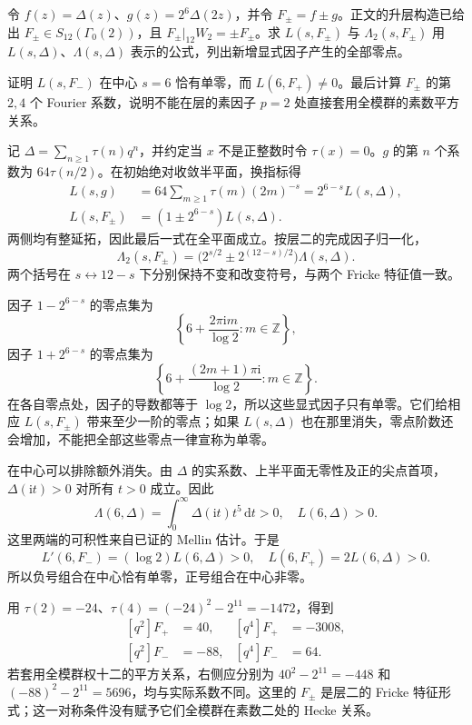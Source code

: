 \begin{exercise}\label{b3:ex:E-4}
令 \(f(z)=\Delta(z)\)、\(g(z)=2^6\Delta(2z)\)，并令 \(F_\pm=f\pm g\)。正文的升层构造已给出 \(F_\pm\in S_{12}(\Gamma_0(2))\)，且 \(F_\pm|_{12}W_2=\pm F_\pm\)。求 \(L(s,F_\pm)\) 与 \(\Lambda_2(s,F_\pm)\) 用 \(L(s,\Delta)\)、\(\Lambda(s,\Delta)\) 表示的公式，列出新增显式因子产生的全部零点。

证明 \(L(s,F_-)\) 在中心 \(s=6\) 恰有单零，而 \(L(6,F_+)\ne0\)。最后计算 \(F_\pm\) 的第 \(2,4\) 个 Fourier 系数，说明不能在层的素因子 \(p=2\) 处直接套用全模群的素数平方关系。
\end{exercise}
\begin{solution}
记 \(\Delta=\sum_{n\ge1}\tau(n)q^n\)，并约定当 \(x\) 不是正整数时令 \(\tau(x)=0\)。\(g\) 的第 \(n\) 个系数为 \(64\tau(n/2)\)。在初始绝对收敛半平面，换指标得
\[
 \begin{aligned}
 L(s,g)&=64\sum_{m\ge1}\tau(m)(2m)^{-s}
        =2^{6-s}L(s,\Delta),\\
 L(s,F_\pm)&=(1\pm2^{6-s})L(s,\Delta).
 \end{aligned}
\]
两侧均有整延拓，因此最后一式在全平面成立。按层二的完成因子归一化，
\[
 \Lambda_2(s,F_\pm)
 =\bigl(2^{s/2}\pm2^{(12-s)/2}\bigr)\Lambda(s,\Delta).
\]
两个括号在 \(s\leftrightarrow12-s\) 下分别保持不变和改变符号，与两个 Fricke 特征值一致。

因子 \(1-2^{6-s}\) 的零点集为
\[
 \left\{6+\frac{2\pi\mathrm{i}m}{\log2}:m\in\mathbb Z\right\},
\]
因子 \(1+2^{6-s}\) 的零点集为
\[
 \left\{6+\frac{(2m+1)\pi\mathrm{i}}{\log2}:m\in\mathbb Z\right\}.
\]
在各自零点处，因子的导数都等于 \(\log2\)，所以这些显式因子只有单零。它们给相应 \(L(s,F_\pm)\) 带来至少一阶的零点；如果 \(L(s,\Delta)\) 也在那里消失，零点阶数还会增加，不能把全部这些零点一律宣称为单零。

在中心可以排除额外消失。由 \(\Delta\) 的实系数、上半平面无零性及正的尖点首项，\(\Delta(\mathrm{i}t)>0\) 对所有 \(t>0\) 成立。因此
\[
 \Lambda(6,\Delta)
 =\int_0^\infty\Delta(\mathrm{i}t)t^5\,\mathrm{d}t>0,
 \quad L(6,\Delta)>0.
\]
这里两端的可积性来自已证的 Mellin 估计。于是
\[
 L'(6,F_-)=(\log2)L(6,\Delta)>0,
 \quad L(6,F_+)=2L(6,\Delta)>0.
\]
所以负号组合在中心恰有单零，正号组合在中心非零。

用 \(\tau(2)=-24\)、\(\tau(4)=(-24)^2-2^{11}=-1472\)，得到
\[
 \begin{aligned}
 [q^2]F_+&=40,&[q^4]F_+&=-3008,\\
 [q^2]F_-&=-88,&[q^4]F_-&=64.
 \end{aligned}
\]
若套用全模群权十二的平方关系，右侧应分别为
\(40^2-2^{11}=-448\) 和 \((-88)^2-2^{11}=5696\)，均与实际系数不同。这里的 \(F_\pm\) 是层二的 Fricke 特征形式；这一对称条件没有赋予它们全模群在素数二处的 Hecke 关系。
\end{solution}

